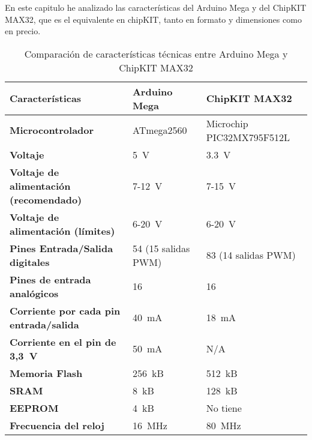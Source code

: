 



En este capitulo he analizado las características del Arduino Mega y del ChipKIT MAX32, que es el equivalente en chipKIT, tanto en formato y dimensiones como en precio.

\begin{table}[hb]
\begin{center}
\begin{tabular}{lll}
  \textbf{Características}                        & \textbf{Arduino Mega}&\textbf{ChipKIT MAX32}\\
  \toprule
  \textbf{Microcontrolador}                       & ATmega2560          & Microchip PIC32MX795F512L\\
  \textbf{Voltaje}                                & 5~V                 & 3.3~V\\
  \textbf{Voltaje de alimentación (recomendado)}  & 7-12~V              & 7-15~V\\
  \textbf{Voltaje de alimentación (límites)}      & 6-20~V              & 6-20~V\\
  \textbf{Pines Entrada/Salida digitales}         & 54 (15 salidas PWM) & 83 (14 salidas PWM)\\
  \textbf{Pines de entrada analógicos}            & 16                  & 16\\
  \textbf{Corriente por cada pin entrada/salida}  & 40~mA               & 18~mA\\
  \textbf{Corriente en el pin de 3,3~V}           & 50~mA               & N/A\\
  \textbf{Memoria Flash}                          & 256~kB              & 512~kB\\
  \textbf{SRAM}                                   & 8~kB                & 128~kB\\
  \textbf{EEPROM}                                 & 4~kB                & No tiene\\
  \textbf{Frecuencia del reloj}                   & 16~MHz              & 80~MHz\\
\end{tabular}
\end{center}
\caption{Comparación de características técnicas entre Arduino Mega y ChipKIT MAX32}
\label{tab:comparacion_specs}
\end{table}

